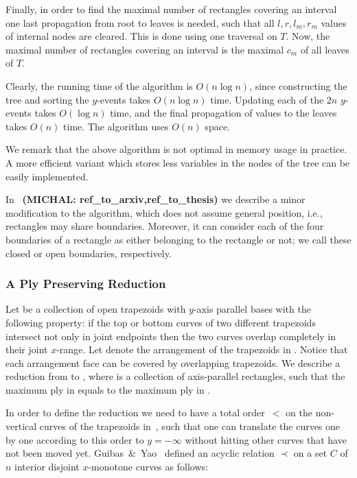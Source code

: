 {{Finally, in order to find the maximal number of rectangles covering
an interval one last propagation from root to leaves is needed, such that
all $l, r, l_m, r_m$ values of internal nodes are cleared. This is done using one
traversal on $T$.
Now, the maximal number of rectangles covering an interval
is the maximal $c_m$ of all leaves of $T$.

Clearly, the running time of the algorithm is $O(n\log n)$,
since constructing the tree and sorting the $y$-events takes
$O(n\log n)$ time. Updating each of the $2n$ $y$-events takes $O(\log n)$
time, and the final propagation of values to the leaves takes $O(n)$ time.
The algorithm uses $O(n)$ space.

We remark that the above algorithm is not optimal in
memory usage in practice. A more efficient variant which stores less variables
in the nodes of the tree can be easily implemented.
}
{
In~\cite{} \textbf{(MICHAL: ref_to_arxiv,ref_to_thesis)}
we describe a minor modification to the algorithm,
which does not assume general position,
i.e., rectangles may share boundaries.
Moreover, it can consider each of the four boundaries
of a rectangle as either belonging to the rectangle or not; we call these closed or open boundaries, respectively.
}
}

\subsubsection {A Ply Preserving Reduction}
\label{subsubsec:eff_ver_alg:reduction}

Let \TcollReduc be a collection of open trapezoids with $y$-axis parallel bases
with the following property:
if the top or bottom curves of two different trapezoids intersect
not only in joint endpoints
then the two curves overlap completely in their joint $x$-range.
Let \Arr{\TcollReduc} denote the arrangement
of the trapezoids in \TcollReduc . Notice that each arrangement face can be covered by overlapping trapezoids.
We describe a reduction from \TcollReduc to
\RcollReduc, where \RcollReduc is a collection of
axis-parallel rectangles, such that the maximum ply
in \Arr{\RcollReduc} equals to the
maximum ply in \Arr{\TcollReduc}.

In order to define the reduction
we need to have a total order~$<$
on the non-vertical curves of the
trapezoids in~\TcollReduc,
such that one can translate the curves
one by one
according to this order
to $y=-\infty$
without hitting other curves that
have not been moved yet.
Guibas~\&~Yao~\cite{GY-TSR-80} defined
an acyclic relation $\prec$ on a set $C$ of $n$ interior disjoint
$x$-monotone curves as follows:

